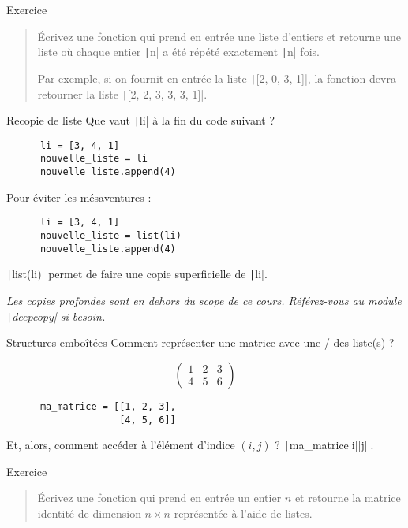 \documentclass[10pt]{beamer}
\begin{document}
\begin{frame}[fragile]{Exercice}
  \begin{quote}
    Écrivez une fonction qui prend en entrée une liste d'entiers et retourne une liste où chaque entier \texttt|n| a été répété exactement \texttt|n| fois.

    Par exemple, si on fournit en entrée la liste \texttt|[2, 0, 3, 1]|, la fonction devra retourner la liste \texttt|[2, 2, 3, 3, 3, 1]|.
  \end{quote}
\end{frame}

\begin{frame}[fragile]{Recopie de liste}  
  Que vaut \texttt|li| à la fin du code suivant ?

  \begin{beamercodeblock}
    \begin{verbatim}
      li = [3, 4, 1]
      nouvelle_liste = li
      nouvelle_liste.append(4)
    \end{verbatim}
  \end{beamercodeblock}

  \pause

  Pour éviter les mésaventures :
  
  \begin{beamercodeblock}
    \begin{verbatim}
      li = [3, 4, 1]
      nouvelle_liste = list(li)
      nouvelle_liste.append(4)
    \end{verbatim}
  \end{beamercodeblock}

  \pause

  \texttt|list(li)| permet de faire une \alert{copie superficielle} de \texttt|li|.

  \emph{Les copies profondes sont en dehors du scope de ce cours. Référez-vous au module \texttt|deepcopy| si besoin.}
\end{frame}

\begin{frame}[fragile]{Structures emboîtées}  
  Comment représenter une matrice avec une / des liste(s) ?

  $$
  \left(
    \begin{matrix}
      1 & 2 & 3 \\
      4 & 5 & 6
    \end{matrix}
  \right)
  $$

  \pause

  \begin{beamercodeblock}
    \begin{verbatim}
      ma_matrice = [[1, 2, 3],
                    [4, 5, 6]]
    \end{verbatim}
  \end{beamercodeblock}

  Et, alors, comment accéder à l'élément d'indice $(i, j)$ ? \pause \texttt|ma_matrice[i][j]|.
\end{frame}

\begin{frame}{Exercice}
  \begin{quote}
    Écrivez une fonction qui prend en entrée un entier $n$ et retourne la matrice identité de dimension $n \times n$ représentée à l'aide de listes.
  \end{quote}
\end{frame}
\end{document}
